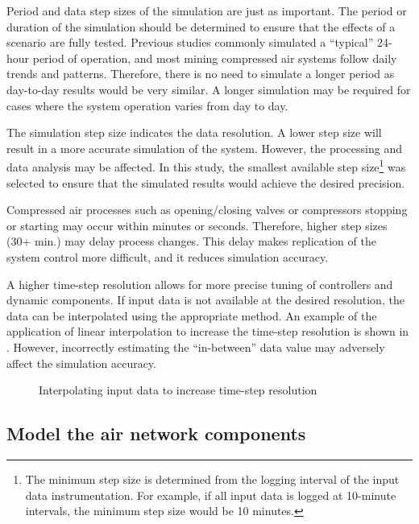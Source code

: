 	\par
	Period and data step sizes of the simulation are just as important. The period or duration of the simulation should be determined to ensure that the effects of a scenario are fully tested. Previous studies commonly simulated a \enquote{typical} 24-hour period of operation, and most mining compressed air systems follow daily trends and patterns. Therefore, there is no need to simulate a longer period as day-to-day results would be very similar. A longer simulation may be required for cases where the system operation varies from day to day.
	\par 
	The simulation step size indicates the data resolution. A lower step size will result in a more accurate simulation of the system. However, the processing and data analysis may be affected. In this study, the smallest available step size\footnote{The minimum step size is determined from the logging interval of the input data instrumentation. For example, if all input data is logged at 10-minute intervals, the minimum step size would be 10 minutes.} was selected to ensure that the simulated results would achieve the desired precision. 
	\par 
	 Compressed air processes such as opening/closing valves or compressors stopping or starting may occur within minutes or seconds. Therefore, higher step sizes (30+ min.) may delay process changes. This delay makes replication of the system control more difficult, and it reduces simulation accuracy.
	\par
	A higher time-step resolution allows for more precise tuning of controllers and dynamic components. If input data is not available at the desired resolution, the data can be interpolated using the appropriate method. An example of the application of linear interpolation to increase the time-step resolution is shown in . However, incorrectly estimating the \enquote{in-between}  data value may adversely affect the simulation accuracy.
	
	\begin{figure}[h]
		\centering
		\fbox{}
		\caption{Interpolating input data to increase time-step resolution}
		\label{fig: Inter}
	\end{figure}
	\subsection{Model the air network components}
